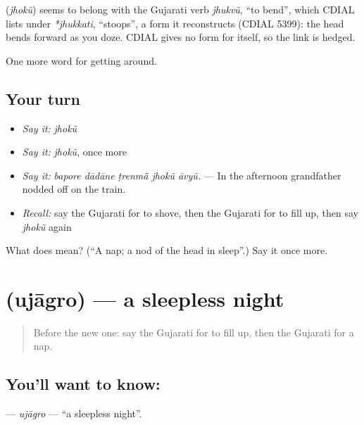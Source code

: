 \begin{cousinweb}
\textbf{} (\emph{jhokũ}) seems to belong with the Gujarati verb \emph{jhukvũ}, \textquotedblleft{}to bend\textquotedblright{}, which CDIAL lists under \emph{*jhukkati}, \textquotedblleft{}stoops\textquotedblright{}, a form it reconstructs (CDIAL 5399): the head bends forward as you doze. CDIAL gives no form for  itself, so the link is hedged.
\end{cousinweb}

\begin{grammarlens}[title={What you've built}]
One more word for getting around.
\end{grammarlens}

\subsection*{Your turn}
\begin{itemize}
\raggedright
  \item \emph{Say it:} \emph{jhokũ}
  \item \emph{Say it:} \emph{jhokũ}, once more
  \item \emph{Say it:} \emph{bapore dādāne ṭrenmā̃ jhokũ āvyũ.} — In the afternoon grandfather nodded off on the train.
  \item \emph{Recall:} say the Gujarati for to shove, then the Gujarati for to fill up, then say \emph{jhokũ} again
\end{itemize}

\begin{tcolorbox}[breakable,colback=teal!4,colframe=teal!35!black,title={Before you move on}]
What does  mean? (\textquotedblleft{}A nap; a nod of the head in sleep\textquotedblright{}.) Say it once more.
\end{tcolorbox}
\section[\texorpdfstring{\gu{ઉજાગરો} (ujāgro)}{ઉજાગરો (ujāgro)}]{ (ujāgro) — a sleepless night}

\label{lesson:GU-C398-ujagro}



\begin{quote}
Before the new one: say the Gujarati for to fill up, then the Gujarati for a nap.
\end{quote}

\subsection*{You'll want to know: }
\textbf{} — \emph{ujāgro} — \textquotedblleft{}a sleepless night\textquotedblright{}.

